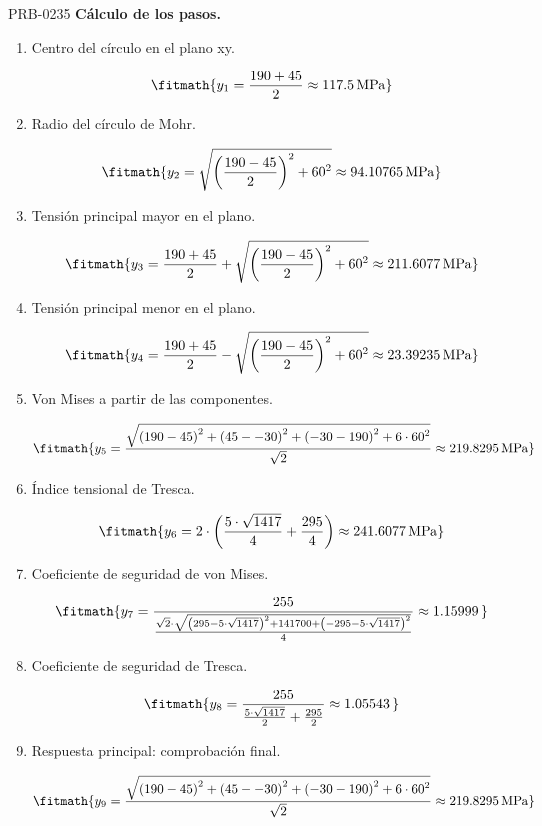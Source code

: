 \begin{studiumworked}{PRB-0235}
\textbf{Cálculo de los pasos.}

\begin{enumerate}

\item Centro del círculo en el plano xy.

\[\fitmath{y_{1}=\frac{190+45}{2}\approx 117.5\,\mathrm{MPa}}\]

\item Radio del círculo de Mohr.

\[\fitmath{y_{2}=\sqrt{{\left(\frac{190-45}{2}\right)}^{2}+{60}^{2}}\approx 94.10765\,\mathrm{MPa}}\]

\item Tensión principal mayor en el plano.

\[\fitmath{y_{3}=\frac{190+45}{2}+\sqrt{{\left(\frac{190-45}{2}\right)}^{2}+{60}^{2}}\approx 211.6077\,\mathrm{MPa}}\]

\item Tensión principal menor en el plano.

\[\fitmath{y_{4}=\frac{190+45}{2}-\sqrt{{\left(\frac{190-45}{2}\right)}^{2}+{60}^{2}}\approx 23.39235\,\mathrm{MPa}}\]

\item Von Mises a partir de las componentes.

\[\fitmath{y_{5}=\frac{\sqrt{{\left(190-45\right)}^{2}+{\left(45--30\right)}^{2}+{\left(-30-190\right)}^{2}+6\cdot {60}^{2}}}{\sqrt{2}}\approx 219.8295\,\mathrm{MPa}}\]

\item Índice tensional de Tresca.

\[\fitmath{y_{6}=2\cdot \left(\frac{5\cdot \sqrt{1417}}{4}+\frac{295}{4}\right)\approx 241.6077\,\mathrm{MPa}}\]

\item Coeficiente de seguridad de von Mises.

\[\fitmath{y_{7}=\frac{255}{\frac{\sqrt{2}\cdot \sqrt{{\left(295-5\cdot \sqrt{1417}\right)}^{2}+141700+{\left(-295-5\cdot \sqrt{1417}\right)}^{2}}}{4}}\approx 1.15999\,}\]

\item Coeficiente de seguridad de Tresca.

\[\fitmath{y_{8}=\frac{255}{\frac{5\cdot \sqrt{1417}}{2}+\frac{295}{2}}\approx 1.05543\,}\]

\item Respuesta principal: comprobación final.

\[\fitmath{y_{9}=\frac{\sqrt{{\left(190-45\right)}^{2}+{\left(45--30\right)}^{2}+{\left(-30-190\right)}^{2}+6\cdot {60}^{2}}}{\sqrt{2}}\approx 219.8295\,\mathrm{MPa}}\]


\end{enumerate}
\end{studiumworked}
